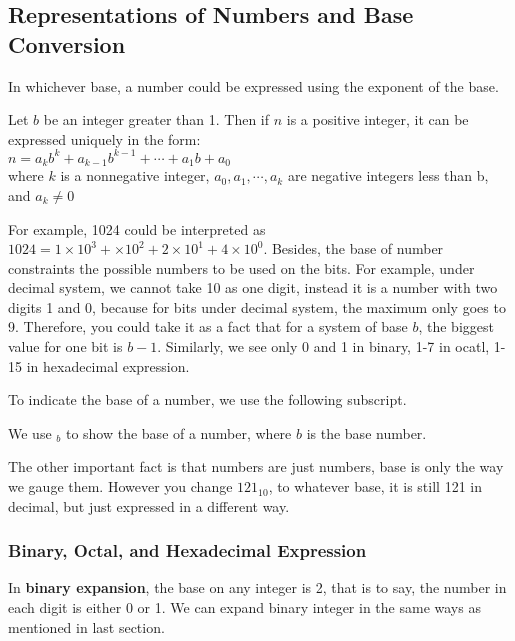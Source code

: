     \subsection{Representations of Numbers and Base Conversion}
    In whichever base, a number could be expressed using the exponent of the base.
    \begin{theorem}
		Let $b$ be an integer greater than 1. Then if $n$ is a positive integer, it can be expressed uniquely 
		in the form:\\
		$n=a_{k} b^{k}+a_{k-1} b^{k-1}+\cdots+a_{1} b+a_{0}$\\
		where $k$ is a nonnegative integer, $a_0, a_1,\cdots, a_k$ are negative integers less than b, and $a_k \neq 0$
	\end{theorem}
    For example, 1024 could be interpreted as $1024 = 1\times10^3+\times10^2+2\times10^1+4\times10^0$.
    Besides, the base of number constraints the possible numbers to be used on the bits. For example,
    under decimal system, we cannot take 10 as one digit, instead it is a number with two digits 1 and 0,
    because for bits under decimal system, the maximum only goes to 9. Therefore, you could take it as
    a fact that for a system of base $b$, the biggest value for one bit is $b-1$. Similarly, we see
    only 0 and 1 in binary, 1-7 in ocatl, 1-15 in hexadecimal expression.

    To indicate the base of a number, we use the following subscript.
    \begin{notation}[$xxxx_b$]
        We use $_b$ to show the base of a number, where $b$ is the base number.
    \end{notation}

    The other important fact is that numbers are just numbers, base is only the way we gauge them.
    However you change $121_{10}$, to whatever base, it is still 121 in decimal, but just expressed 
    in a different way.
    \subsubsection*{Binary, Octal, and Hexadecimal Expression}
    In \textbf{binary expansion}, the base on any integer is 2, that is to say, the number in each digit is either 0 or 1.
We can expand binary integer in the same ways as mentioned in last section.

